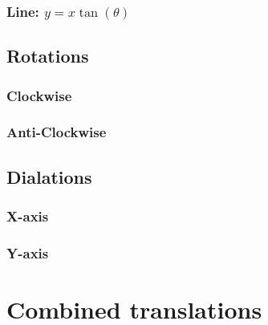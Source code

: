 \documentclass{book}
\begin{document}
\subsubsection{Line: $y = x \tan(\theta)$}

\subsection{Rotations}
\subsubsection{Clockwise}

\subsubsection{Anti-Clockwise}

\subsection{Dialations}
\subsubsection{X-axis}

\subsubsection{Y-axis}

\section{Combined translations}
\end{document}
